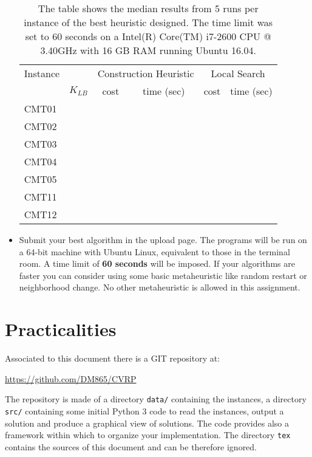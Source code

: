 \begin{itemize}
\begin{table}[tb]
\begin{center}
\begin{tabular}{|l||r|c|c|c|c|}
  \hline
Instance&
&\multicolumn{2}{c|}{Construction Heuristic} & \multicolumn{2}{c|}{Local Search}\\
& $K_{LB}$&cost&time (sec)&cost&time (sec)\\
  \hline
CMT01 &  &&&& \\
CMT02 &  &&&& \\
CMT03 &  &&&& \\
CMT04 &  &&&& \\
CMT05 &  &&&& \\
CMT11 &  &&&& \\
CMT12 &  &&&& \\
\hline
\end{tabular}
\end{center}
\caption{\label{tabexample} The table shows the median results from 5 runs
  per instance of the best heuristic designed. The time limit was set to
  60 seconds on a Intel(R) Core(TM) i7-2600 CPU @ 3.40GHz with 16 GB RAM
  running Ubuntu 16.04.} 
\end{table}


\item Submit your best algorithm in the upload page. The programs will
  be run on a 64-bit machine with Ubuntu Linux, equivalent to those in
  the terminal room. A time limit of \textbf{60 seconds} will be
  imposed. If your algorithms are faster you can consider using some
  basic metaheuristic like random restart or neighborhood change. No
  other metaheuristic is allowed in this assignment.

\end{itemize}






\section*{Practicalities}

Associated to this document there is a GIT repository at:

\begin{center}
\url{https://github.com/DM865/CVRP}
\end{center}

The repository is made of a directory \verb!data/! containing the
instances, a directory \verb!src/! containing some initial Python 3 code
to read the instances, output a solution and produce a graphical view of
solutions. The code provides also a framework within which to organize
your implementation. The directory \verb!tex! contains the sources of
this document and can be therefore ignored.

